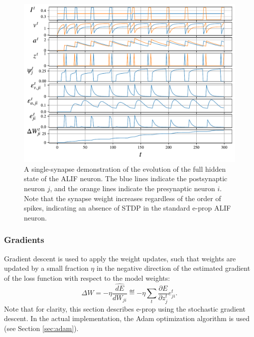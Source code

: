             \begin{figure}[ht]
                \centering
                \includegraphics[width=\linewidth]{gfx/alif}
                \caption[Single-synapse ALIF demo.]{A single-synapse demonstration of the evolution of the full hidden state of the ALIF neuron. The blue lines indicate the postsynaptic neuron $j$, and the orange lines indicate the presynaptic neuron $i$. Note that the synapse weight increases regardless of the order of spikes, indicating an absence of STDP in the standard e-prop ALIF neuron.}
                \label{fig:alif}
            \end{figure}

        \subsubsection{Gradients}\label{sec:eprop_grd}
            Gradient descent is used to apply the weight updates, such that weights are updated by a small fraction $\eta$ in the negative direction of the estimated gradient of the loss function with respect to the model weights:
            \begin{equation}\label{eq:eprop_grd}
                \Delta W = -\eta\widehat{\frac{dE}{dW_{ji}}} \eqdef -\eta\sum_t\frac{\partial E}{\partial z^t_j}e^t_{ji}.
            \end{equation}
            Note that for clarity, this section describes e-prop using the stochastic gradient descent.
            In the actual implementation, the Adam optimization algorithm \citep{kingma2014adam} is used (see Section \ref{sec:adam}).

